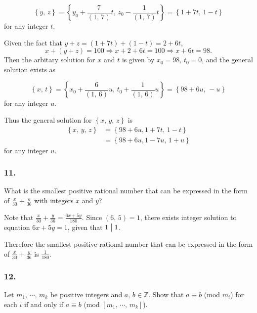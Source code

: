 \[
    \left\{y,\,z\right\}
    = \left\{y_0 + \frac{7}{\left(1,\,7\right)}t,\, z_0 - \frac{1}{\left(1,\,7\right)}t\right\}
    = \left\{1 + 7t,\, 1 - t\right\}
\]
for any integer $t$.

Given the fact that $y+z=\left(1+7t\right)+\left(1-t\right)=2+6t$,
\[
    x+\left(y+z\right)=100 \Rightarrow x+2+6t=100 \Rightarrow x+6t=98.  
\]
Then the arbitary solution for $x$ and $t$ is given by $x_0=98,\,t_0=0$,
and the general solution exists as

\[
    \left\{x,\,t\right\}
    = \left\{x_0 + \frac{6}{\left(1,\,6\right)}u,\, t_0 + \frac{1}{\left(1,\,6\right)}u\right\}
    = \left\{98 + 6u,\, -u\right\}
\]
for any integer $u$.

Thus the general solution for $\left\{x,\,y,\,z\right\}$ is
\begin{align*}
    \left\{x,\,y,\,z\right\} &= \left\{98+6u, 1+7t,\,1-t\right\} \\
    &= \left\{98+6u, 1-7u,\,1+u\right\}
\end{align*}
for any integer $u$.

\subsubsection{11.} What is the smallest positive rational number that can be expressed
in the form of $\frac{x}{30}+ \frac{y}{36}$ with integers $x$ and $y$?

Note that $\frac{x}{30}+\frac{y}{36}=\frac{6x+5y}{180}$.
Since $\left(6,\,5\right)=1$, there exists integer solution to equation
$6x+5y=1$, given that $1\bigm| 1$.

Therefore the smallest positive rational number that can be expressed
in the form of $\frac{x}{30}+ \frac{y}{36}$ is $\frac{1}{180}$.

\subsubsection{12.} Let $m_1,\,\cdots,\,m_k$ be positive integers and $a,\,b\in\mathbb{Z}$.
Show that $a\equiv b$ (mod $m_i$) for each $i$ if and only if $a \equiv b$ (mod $\left[m_1,\,\cdots,\,m_k\right]$). %

